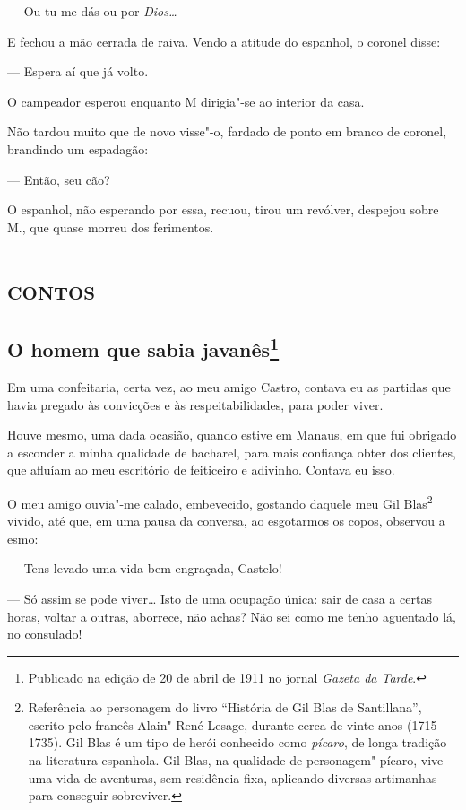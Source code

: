 --- Ou tu me dás ou por \emph{Dios\ldots{}}

E fechou a mão cerrada de raiva. Vendo a atitude do espanhol, o coronel
disse:

--- Espera aí que já volto.

O campeador esperou enquanto M dirigia"-se ao interior da casa.

Não tardou muito que de novo visse"-o, fardado de ponto em branco de
coronel, brandindo um espadagão:

--- Então, seu cão?

O espanhol, não esperando por essa, recuou, tirou um revólver, despejou
sobre M., que quase morreu dos ferimentos.



\part{\textsc{contos}}


\chapter[O homem que sabia javanês]{O homem que sabia javanês\footnote[*]{Publicado na edição de 20 de abril de 1911 no jornal \emph{Gazeta da Tarde}.}}

Em uma confeitaria, certa vez, ao meu amigo Castro, contava eu as
partidas que havia pregado às convicções e às respeitabilidades, para
poder viver.

Houve mesmo, uma dada ocasião, quando estive em Manaus, em que fui
obrigado a esconder a minha qualidade de bacharel, para mais confiança
obter dos clientes, que afluíam ao meu escritório de feiticeiro e
adivinho. Contava eu isso.

O meu amigo ouvia"-me calado, embevecido, gostando daquele meu Gil
Blas\footnote{Referência ao personagem do livro ``História de Gil Blas
  de Santillana'', escrito pelo francês Alain"-René Lesage, durante cerca
  de vinte anos (1715--1735). Gil Blas é um tipo de herói conhecido
  como \emph{pícaro}, de longa tradição na literatura espanhola. Gil
  Blas, na qualidade de personagem"-pícaro, vive uma vida de aventuras,
  sem residência fixa, aplicando diversas artimanhas para conseguir
  sobreviver.} vivido, até que, em uma pausa da conversa, ao esgotarmos
os copos, observou a esmo:

--- Tens levado uma vida bem engraçada, Castelo!

--- Só assim se pode viver\ldots{} Isto de uma ocupação única: sair de casa a
certas horas, voltar a outras, aborrece, não achas? Não sei como me
tenho aguentado lá, no consulado!

